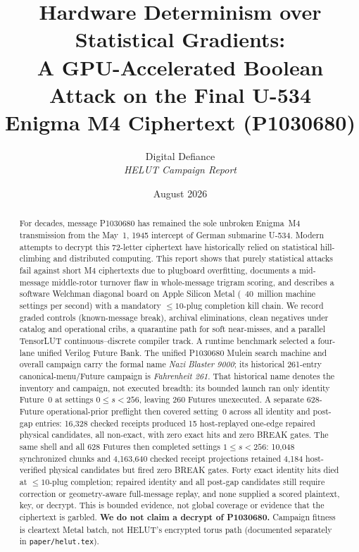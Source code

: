 \documentclass[11pt,a4paper]{article}
\title{\textbf{Hardware Determinism over Statistical Gradients:}\\
\large A GPU-Accelerated Boolean Attack on the Final U-534\\
Enigma M4 Ciphertext (P1030680)}
\author{Digital Defiance\\
\textit{HELUT Campaign Report}}
\date{August 2026}
\begin{document}
\maketitle

\begin{abstract}
For decades, message P1030680 has remained the sole unbroken Enigma~M4
transmission from the May~1, 1945 intercept of German submarine U-534.
Modern attempts to decrypt this 72-letter ciphertext have historically
relied on statistical hill-climbing and distributed computing.
This report shows that purely statistical attacks fail against short
M4 ciphertexts due to plugboard overfitting, documents a mid-message
middle-rotor turnover flaw in whole-message trigram scoring, and
describes a software Welchman diagonal board on Apple Silicon Metal
(~40~million machine settings per second) with a mandatory $\le 10$-plug
completion kill chain.
We record graded controls (known-message break), archival eliminations,
clean negatives under catalog and operational cribs, a quarantine path
for soft near-misses, and a parallel TensorLUT continuous--discrete
compiler track. A runtime benchmark selected a four-lane unified Verilog
Future Bank. The unified P1030680 Mulein search machine and overall campaign
carry the formal name \emph{Nazi Blaster 9000}; its historical 261-entry
canonical-menu/Future campaign is \emph{Fahrenheit 261}. That historical name
denotes the inventory and campaign, not executed breadth: its bounded launch
ran only identity Future~0 at settings $0\le s<256$, leaving 260 Futures
unexecuted. A separate 628-Future operational-prior preflight then covered
setting~0 across all identity and post-gap entries: 16{,}328 checked receipts
produced 15 host-replayed one-edge repaired physical candidates, all non-exact,
with zero exact hits and zero BREAK gates. The same shell and all 628 Futures
then completed settings $1\le s<256$: 10{,}048 synchronized chunks and
4{,}163{,}640 checked receipt projections retained 4{,}184 host-verified physical
candidates but fired zero BREAK gates. Forty exact identity hits died at
$\le10$-plug completion; repaired identity and all post-gap candidates still
require correction or geometry-aware full-message replay, and none supplied a
scored plaintext, key, or decrypt. This is bounded evidence, not global coverage
or evidence that the ciphertext is garbled.
\textbf{We do not claim a decrypt of P1030680.}
Campaign fitness is cleartext Metal batch, not HELUT's encrypted torus
path (documented separately in \texttt{paper/helut.tex}).
\end{abstract}
\end{document}
